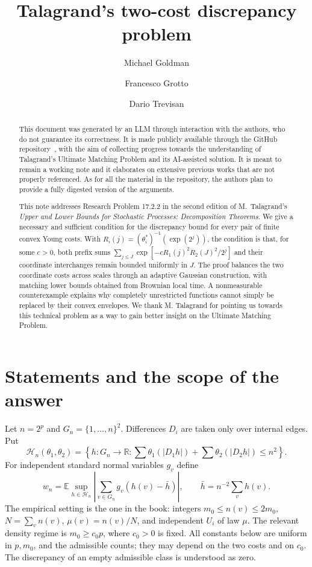 \documentclass[11pt]{article}
\title{Talagrand's two-cost discrepancy problem}
\author{Michael Goldman \and Francesco Grotto \and Dario Trevisan}
\date{}
\newenvironment{aiuse}
  {\renewcommand{\abstractname}{AI use}\begin{abstract}}
  {\end{abstract}}
\newcommand{\E}{\mathbb E}
\newcommand{\R}{\mathbb R}
\numberwithin{equation}{section}
\begin{document}
\maketitle

\begin{aiuse}
This document was generated by an LLM through interaction with the authors,
who do not guarantee its correctness. 
It is made publicly available through the GitHub repository~\cite{repository}, 
with the aim of collecting progress towards the understanding of Talagrand's Ultimate Matching Problem
and its AI-assisted solution. 
It is meant to remain a working note and it elaborates on extensive previous works that are not properly referenced. 
As for all the material in the repository, the authors plan to provide a fully digested
version of the arguments. 
\end{aiuse}

\begin{abstract}
This note addresses Research Problem 17.2.2 in the second edition of
M.~Talagrand's \emph{Upper and Lower Bounds for Stochastic Processes:
Decomposition Theorems}.
We give a necessary and sufficient condition for the discrepancy bound
for every pair of finite convex Young costs. With
$R_i(j)=(\theta_i^*)^{-1}(\exp(2^j))$, the condition is that, for some
$c>0$, both prefix sums
$\sum_{j\le J}\exp[-c R_1(j)^2R_2(J)^2/2^j]$ and their coordinate
interchanges remain bounded uniformly in $J$. 
The proof balances the two coordinate costs across scales through an
adaptive Gaussian construction, with matching lower bounds obtained
from Brownian local time.
A nonmeasurable counterexample explains why completely unrestricted
functions cannot simply be replaced by their convex envelopes.
We thank M. Talagrand for pointing us towards this technical problem as a way to gain better insight on the Ultimate Matching Problem.
\end{abstract}

\section{Statements and the scope of the answer}
Let $n=2^p$ and $G_n=\{1,\ldots,n\}^2$. Differences $D_i$ are taken
only over internal edges. Put
\[
 \mathcal H_n(\theta_1,\theta_2)=
 \left\{h:G_n\to\R:
 \sum\theta_1(|D_1h|)+\sum\theta_2(|D_2h|)\le n^2\right\}.
\]
For independent standard normal variables $g_v$ define
\[
 w_n=\E\sup_{h\in\mathcal H_n}
       \left|\sum_{v\in G_n}g_v(h(v)-\bar h)\right|,
 \qquad \bar h=n^{-2}\sum_vh(v).
\]
The empirical setting is the one in the book: integers
$m_0\le n(v)\le2m_0$, $N=\sum_vn(v)$,
$\mu(v)=n(v)/N$, and independent $U_i$ of law $\mu$.
The relevant density regime is $m_0\ge c_0p$, where $c_0>0$ is fixed.
All constants below are uniform in $p,m_0$, and the admissible counts;
they may depend on the two costs and on $c_0$.
The discrepancy of an empty admissible class is understood as zero.
\end{document}
